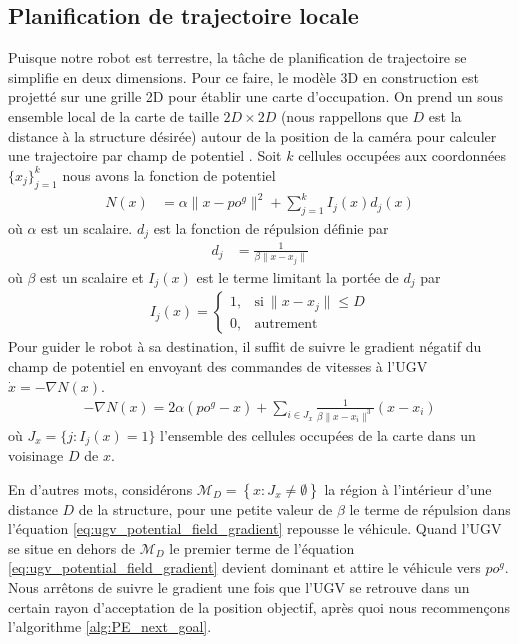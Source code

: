 \subsection{Planification de trajectoire locale}

Puisque notre robot est terrestre, la tâche de planification de trajectoire se simplifie en deux dimensions. Pour ce faire, le modèle 3D en construction est projetté sur une grille 2D pour établir une carte d'occupation. On prend un sous ensemble local de la carte de taille $2D \times 2D$ (nous rappellons que $D$ est la distance à la structure désirée) autour de la position de la caméra pour calculer une trajectoire par champ de potentiel \citep{Khatib1990, Choset2005}. Soit $k$ cellules occupées aux coordonnées $\{x_j\}^k_{j=1}$ nous avons la fonction de potentiel
\begin{align}
  N(x) &= \alpha \| x - {po}^g \|^2 + \sum^k_{j=1} I_j(x)d_j(x)
\end{align}
où $\alpha$ est un scalaire. $d_j$ est la fonction de répulsion définie par
\begin{align}
  d_j &= \frac{1}{\beta \| x - x_j \|}
\end{align}
où $\beta$ est un scalaire et $I_j(x)$ est le terme limitant la portée de $d_j$ par
\begin{align}
  I_j(x) =     \begin{cases}
      1, & \text{si}\ \|x - x_j\| \leq D \\
      0, & \text{autrement}
    \end{cases}
\end{align}
Pour guider le robot à sa destination, il suffit de suivre le gradient négatif du champ de potentiel en envoyant des commandes de vitesses à l'UGV $\dot x = -\nabla N(x)$.
\begin{align}
  - \nabla N(x) = 2 \alpha ({po}^g - x) + \sum_{i \in J_x}\frac{1}{\beta \| x - x_i\|^3}(x - x_i)
  \label{eq:ugv_potential_field_gradient}
\end{align}
où $J_x = \{ j : I_j(x) = 1\}$ l'ensemble des cellules occupées de la carte dans un voisinage $D$ de $x$.

En d'autres mots, considérons $\mathcal M_D = \left\lbrace x : J_{x} \neq \emptyset \right\rbrace $ la région à l'intérieur d'une distance $D$ de la structure, pour une petite valeur de $\beta$ le terme de répulsion dans l'équation \ref{eq:ugv_potential_field_gradient} repousse le véhicule. Quand l'UGV se situe en dehors de $\mathcal M_D$ le premier terme de l'équation \ref{eq:ugv_potential_field_gradient} devient dominant et attire le véhicule vers $po^g$. Nous arrêtons de suivre le gradient une fois que l'UGV se retrouve dans un certain rayon d'acceptation de la position objectif, après quoi nous recommençons l'algorithme \ref{alg:PE_next_goal}.

